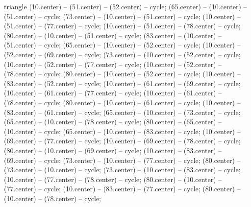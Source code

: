 \begin{pgfonlayer}{triangle}
 (10.center) -- (51.center) -- (52.center) -- cycle; 
 (65.center) -- (10.center) -- (51.center) -- cycle; 
 (73.center) -- (10.center) -- (51.center) -- cycle; 
 (10.center) -- (51.center) -- (77.center) -- cycle; 
 (10.center) -- (51.center) -- (78.center) -- cycle; 
 (80.center) -- (10.center) -- (51.center) -- cycle; 
 (83.center) -- (10.center) -- (51.center) -- cycle; 
 (65.center) -- (10.center) -- (52.center) -- cycle; 
 (10.center) -- (52.center) -- (69.center) -- cycle; 
 (73.center) -- (10.center) -- (52.center) -- cycle; 
 (10.center) -- (52.center) -- (77.center) -- cycle; 
 (10.center) -- (52.center) -- (78.center) -- cycle; 
 (80.center) -- (10.center) -- (52.center) -- cycle; 
 (10.center) -- (83.center) -- (52.center) -- cycle; 
 (10.center) -- (61.center) -- (69.center) -- cycle; 
 (10.center) -- (61.center) -- (77.center) -- cycle; 
 (10.center) -- (61.center) -- (78.center) -- cycle; 
 (80.center) -- (10.center) -- (61.center) -- cycle; 
 (10.center) -- (83.center) -- (61.center) -- cycle; 
 (65.center) -- (10.center) -- (73.center) -- cycle; 
 (65.center) -- (10.center) -- (78.center) -- cycle; 
 (80.center) -- (65.center) -- (10.center) -- cycle; 
 (65.center) -- (10.center) -- (83.center) -- cycle; 
 (10.center) -- (69.center) -- (77.center) -- cycle; 
 (10.center) -- (69.center) -- (78.center) -- cycle; 
 (80.center) -- (10.center) -- (69.center) -- cycle; 
 (10.center) -- (83.center) -- (69.center) -- cycle; 
 (73.center) -- (10.center) -- (77.center) -- cycle; 
 (80.center) -- (73.center) -- (10.center) -- cycle; 
 (73.center) -- (10.center) -- (83.center) -- cycle; 
 (10.center) -- (77.center) -- (78.center) -- cycle; 
 (80.center) -- (10.center) -- (77.center) -- cycle; 
 (10.center) -- (83.center) -- (77.center) -- cycle; 
 (80.center) -- (10.center) -- (78.center) -- cycle; 

\end{pgfonlayer}
